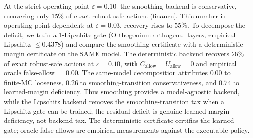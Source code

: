 At the strict operating point $\varepsilon=0.10$, the smoothing backend is conservative, recovering only $15\%$ of exact robust-safe actions (finance). This number is operating-point dependent: at $\varepsilon=0.03$, recovery rises to $55\%$. To decompose the deficit, we train a 1-Lipschitz gate (Orthogonium orthogonal layers; empirical Lipschitz $\le 0.4378$) and compare the smoothing certificate with a deterministic margin certificate on the SAME model. The deterministic backend recovers $26\%$ of exact robust-safe actions at $\varepsilon=0.10$, with $C_{\mathrm{allow}}=U_{\mathrm{allow}}=0$ and empirical oracle false-allow $=0.00$. The same-model decomposition attributes $0.00$ to finite-MC looseness, $0.26$ to smoothing-transition conservativeness, and $0.74$ to learned-margin deficiency. Thus smoothing provides a model-agnostic backend, while the Lipschitz backend removes the smoothing-transition tax when a Lipschitz gate can be trained; the residual deficit is genuine learned-margin deficiency, not backend tax. The deterministic certificate certifies the learned gate; oracle false-allows are empirical measurements against the executable policy.
